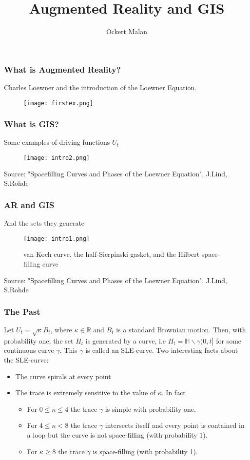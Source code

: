 \documentclass[10pt, compress]{beamer}
\title{Augmented Reality and GIS}
\subtitle{}
\author{Ockert Malan}
\institute{}
\begin{document}
\maketitle

\begin{frame}[fragile]
\frametitle{What is Augmented Reality?}
Charles Loewner and the introduction of the Loewner Equation.
\begin{figure}
  \centering
 \texttt{[image: firstex.png]}
\end{figure}

\end{frame}

\begin{frame}[fragile]
  \frametitle{What is GIS?}
  Some examples of driving functions $U_{t}$
\begin{figure}
  \centering
 \texttt{[image: intro2.png]}
\end{figure}
\tiny
Source: "Spacefilling Curves and Phases of the Loewner Equation", J.Lind, S.Rohde
\normalsize
\end{frame}

\begin{frame}[fragile]
  \frametitle{AR and GIS}
And the sets they generate
\begin{figure}
  \centering
 \texttt{[image: intro1.png]}
 \caption{van Koch curve, the half-Sierpinski gasket, and the Hilbert space-filling curve}
\end{figure}
\tiny
Source: "Spacefilling Curves and Phases of the Loewner Equation", J.Lind, S.Rohde
\normalsize
\end{frame}

\begin{frame}[fragile]
  \frametitle{The Past}
Let $U_{t}=\sqrt{\kappa}B_{t}$, where $\kappa \in \mathbb{R}$ and $B_{t}$ is a standard Brownian motion. Then, with probability one, the set $H_{t}$ is generated by a curve, i.e $H_{t}=\mathbb{H}\backslash \gamma(0,t]$ for some continuous curve $\gamma$. This $\gamma$ is called an SLE-curve. Two interesting facts about the SLE-curve:


\begin{itemize}
\item The curve spirals at every point
\item The trace is extremely sensitive to the value of $\kappa$. In fact
\begin{itemize}
\item For $0 \leq \kappa \leq 4$ the trace $\gamma$ is simple with probability one.
\item For $4 \leq \kappa < 8$ the trace $\gamma$ intersects itself and every point is contained in a loop but the curve is not space-filling (with probability 1).
\item For $\kappa \geq 8$ the trace $\gamma$ is space-filling (with probability 1).
\end{itemize}
\end{itemize}

\end{frame}
\end{document}
